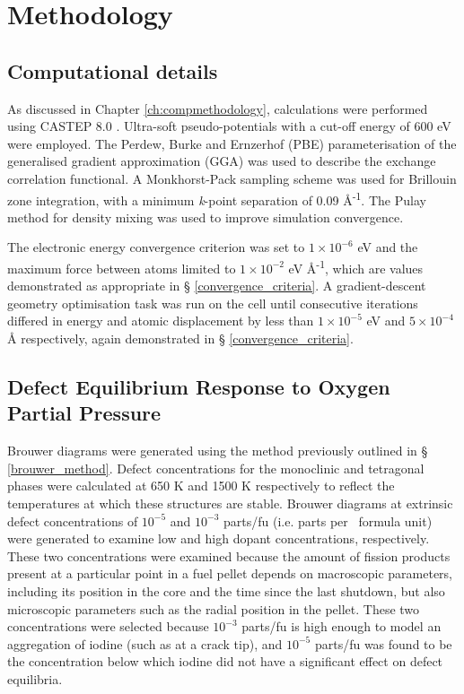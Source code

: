 \section{Methodology}
\subsection{Computational details}

As discussed in Chapter \ref{ch:compmethodology}, calculations were performed using CASTEP 8.0 \cite{Clark2005}. Ultra-soft pseudo-potentials with a cut-off energy of 600 eV were employed. The Perdew, Burke and Ernzerhof (PBE) \cite{Perdew1996} parameterisation of the generalised gradient approximation (GGA) was used to describe the exchange correlation functional. A Monkhorst-Pack sampling scheme \cite{Monkhorst1976} was used for Brillouin zone integration, with a minimum \emph{k}-point separation of 0.09 \r{A}\textsuperscript{-1}. The Pulay method for density mixing \cite{Pulay1980} was used to improve simulation convergence. 

The electronic energy convergence criterion was set to $1\times10^{-6}$ eV and the maximum force between atoms limited to $1\times10^{-2}$ eV \r{A}\textsuperscript{-1}, which are values demonstrated as appropriate in § \ref{convergence_criteria}. A gradient-descent geometry optimisation task was run on the cell until consecutive iterations differed in energy and atomic displacement by less than $1\times10^{-5}$ eV and $5\times10^{-4}$ \r{A} respectively, again demonstrated in § \ref{convergence_criteria}. 


\subsection{Defect Equilibrium Response to Oxygen Partial Pressure}

Brouwer diagrams were generated using the method previously outlined in § \ref{brouwer_method}. Defect concentrations for the monoclinic and tetragonal phases were calculated at 650 K and 1500 K respectively to reflect the temperatures at which these structures are stable. Brouwer diagrams at extrinsic defect concentrations of $10^{-5}$ and $10^{-3}$ parts/fu (i.e. parts per \zirconia\ formula unit) were generated to examine low and high dopant concentrations, respectively. These two concentrations were examined because the amount of fission products present at a particular point in a fuel pellet depends on macroscopic parameters, including its position in the core and the time since the last shutdown, but also microscopic parameters such as the radial position in the pellet. These two concentrations were selected because $10^{-3}$ parts/fu is high enough to model an aggregation of iodine (such as at a crack tip), and $10^{-5}$ parts/fu was found to be the concentration below which iodine did not have a significant effect on defect equilibria. 


